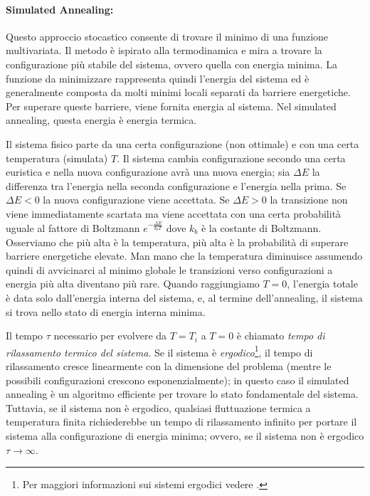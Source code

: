 \paragraph{Simulated Annealing:} Questo approccio stocastico consente di trovare il minimo di una funzione multivariata. Il metodo è ispirato alla termodinamica e mira a trovare la configurazione più stabile del sistema, ovvero quella con energia minima. La funzione da minimizzare rappresenta quindi l'energia del sistema ed è generalmente composta da molti minimi locali separati da barriere energetiche. Per superare queste barriere, viene fornita energia al sistema. Nel simulated annealing, questa energia è energia termica.

Il sistema fisico parte da una certa configurazione (non ottimale) e con una certa temperatura (simulata) $T$. Il sistema cambia configurazione secondo una certa euristica e nella nuova configurazione avrà una nuova energia; sia $\Delta E$ la differenza tra l'energia nella seconda configurazione e l'energia nella prima. Se $\Delta E < 0$ la nuova configurazione viene accettata. Se $\Delta E > 0$ la transizione non viene immediatamente scartata ma viene accettata con una certa probabilità uguale al fattore di Boltzmann $e^{-\frac{\Delta E}{k_b T}}$ dove $k_b$ è la costante di Boltzmann. Osserviamo che più alta è la temperatura, più alta è la probabilità di superare barriere energetiche elevate. Man mano che la temperatura diminuisce \textemdash{}assumendo quindi di avvicinarci al minimo globale\textemdash{} le transizioni verso configurazioni a energia più alta diventano più rare. Quando raggiungiamo $T = 0$, l'energia totale è data solo dall'energia interna del sistema, e, al termine dell'annealing, il sistema si trova nello stato di energia interna minima.

Il tempo $\tau$ necessario per evolvere da $T = T_i$ a $T = 0$ è chiamato \emph{tempo di rilassamento termico del sistema}. Se il sistema è \emph{ergodico}\footnote{Per maggiori informazioni sui sistemi ergodici vedere \cite{kim2005ergodicity}.}, il tempo di rilassamento cresce linearmente con la dimensione del problema (mentre le possibili configurazioni crescono esponenzialmente); in questo caso il simulated annealing è un algoritmo efficiente per trovare lo stato fondamentale del sistema. Tuttavia, se il sistema non è ergodico, qualsiasi fluttuazione termica a temperatura finita richiederebbe un tempo di rilassamento infinito per portare il sistema alla configurazione di energia minima; ovvero, se il sistema non è ergodico $\tau \rightarrow \infty$.

